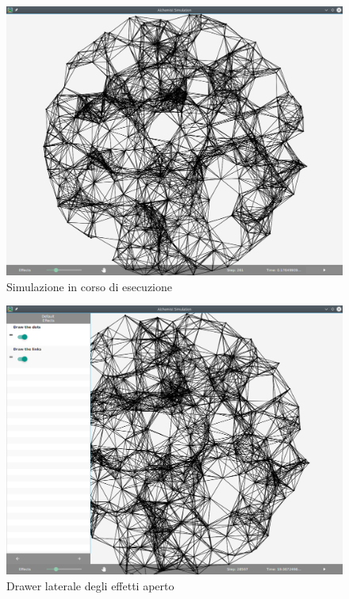         \begin{figure}[htbp]
            \centering
            \includegraphics[scale=0.45]{img/withNodes/simWithNodes}
            \caption{Simulazione in corso di esecuzione}
            \label{fig:simWithNodes}
        \end{figure}

        \begin{figure}[htbp]
            \centering
            \includegraphics[scale=0.45]{img/withNodes/simWithEff}
            \caption{Drawer laterale degli effetti aperto}
            \label{fig:simWithEff}
        \end{figure}

